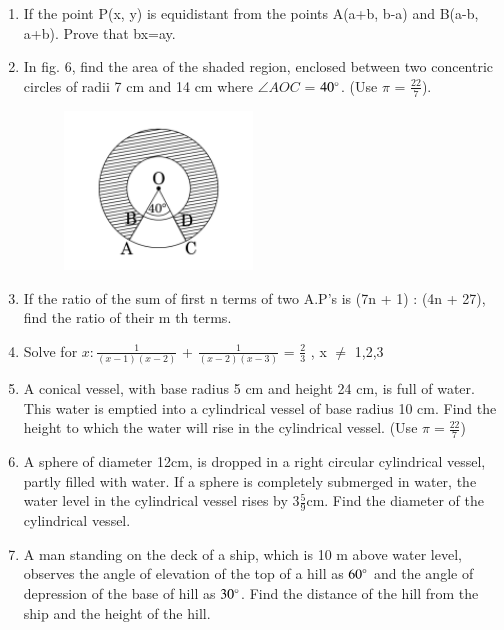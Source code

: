 \documentclass[journal,12pt,twocolumn]{IEEEtran}
\begin{document}
\begin{enumerate}
\item  If the point P(x, y) is equidistant from the points A(a+b, b-a) and B(a-b, a+b). Prove that bx=ay.\\
   
\item  In fig. 6, find the area of the shaded region, enclosed between two concentric circles of radii 7 cm and 14 cm where $\angle AOC$ = $40\degree$. (Use $\pi$ = $\frac{22}{7}$).
	\begin{figure}[H]
      \centering
      \includegraphics[width=5cm]{6.png}
      \label{fig:my_label}
\end{figure} 

\item  If the ratio of the sum of first n terms of two A.P's is (7n + 1) : (4n + 27), find the ratio of their m th terms.\\

\item  Solve for $ x :  \frac{1}{(x-1)(x-2)} $ + $ \frac{1}{(x-2)(x-3)} $ = $ \frac{2}{3}$ , x $\neq$ 1,2,3   \\     
\item  A conical vessel, with base radius 5 cm and height 24 cm, is full of water. This water is emptied into a cylindrical vessel of base radius 10 cm. Find the height to which the water will rise in the cylindrical vessel. (Use $ \pi  = \frac{22}{7}$)\\

\item  A sphere of diameter 12cm, is dropped in a right circular cylindrical vessel, partly filled with water. If a sphere is completely submerged in water, the water level in the cylindrical vessel rises by $ 3 \frac{5}{9}$cm. Find the diameter of the cylindrical vessel.\\  

\item  A man standing on the deck of a ship, which is 10 m above water level, observes the angle of elevation of the top of a hill as $ 60\degree $ and the angle of depression of the base of hill as $ 30 \degree $. Find the distance of the hill from the ship and the height of the hill.\\
 

\end{enumerate}
\end{document}
